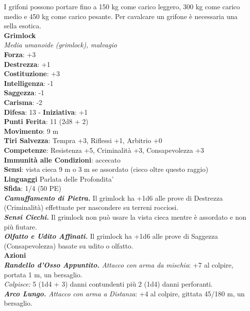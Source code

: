 \begin{multicols}{2}
I grifoni possono portare fino a 150 kg come carico leggero, 300 kg come carico medio e 450 kg come carico pesante. Per cavalcare un grifone è necessaria una sella esotica.\\


\medskip\textbf{Grimlock}\\
\emph{Media umanoide (grimlock), malvagio}\\
\textbf{Forza}: +3\\
\textbf{Destrezza}: +1\\
\textbf{Costituzione}: +3\\
\textbf{Intelligenza}: -1\\
\textbf{Saggezza}: -1\\
\textbf{Carisma}: -2\\
\textbf{Difesa}: 13 - \textbf{Iniziativa}: +1\\
\textbf{Punti Ferita}: 11 (2d8 + 2)\\
\textbf{Movimento}: 9 m\\
\textbf{Tiri Salvezza}: Tempra +3, Riflessi +1, Arbitrio +0\\
\textbf{Competenze}: Resistenza +5, Criminalità +3, Consapevolezza +3\\
\textbf{Immunità alle Condizioni}: accecato\\
\textbf{Sensi}: vista cieca 9 m o 3 m se assordato (cieco oltre questo raggio)\\
\textbf{Linguaggi} Parlata delle Profondita'\\
\textbf{Sfida}: 1/4 (50 PE)\smallskip\\
\emph{\textbf{Camuffamento di Pietra.}} Il grimlock ha +1d6 alle prove di Destrezza (Criminalità) effettuate per nascondere su terreni rocciosi.\\
\emph{\textbf{Sensi Ciechi.}} Il grimlock non può usare la vista cieca mentre è assordato e non più fiutare.\\
\emph{\textbf{Olfatto e Udito Affinati.}} Il grimlock ha +1d6 alle prove di Saggezza (Consapevolezza) basate su udito o olfatto.\\
\smallskip\textbf{Azioni}\\
\emph{\textbf{Randello d'Osso Appuntito.} Attacco con arma da mischia}: +7 al colpire, portata 1 m, un bersaglio.\\
\emph{Colpisce:} 5 (1d4 + 3) danni contundenti più 2 (1d4) danni perforanti.\\
\emph{\textbf{Arco Lungo.} Attacco con arma a Distanza}: +4 al colpire, gittata 45/180 m, un bersaglio.\\

\end{multicols}
